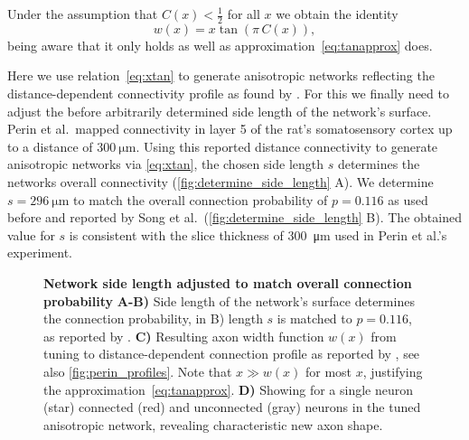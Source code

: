 Under the assumption that $C(x)<\frac{1}{2}$ for all $x$ we obtain the
identity
\begin{equation}
  w(x) = x \tan\left( \pi\, C(x) \right), \label{eq:xtan}
\end{equation} 
being aware that it only holds as well as
approximation~\ref{eq:tanapprox} does. 

Here we use relation~\ref{eq:xtan} to generate anisotropic networks
reflecting the dis\-tance-de\-pendent connectivity profile as found by
\textcite{Perin2011}. For this we finally need to adjust the before
arbitrarily determined side length of the network's surface. Perin et
al.~mapped connectivity in layer 5 of the rat's somatosensory cortex
up to a distance of $\SI{300}{\micro\meter}$. Using this reported
distance connectivity to generate anisotropic networks via
\ref{eq:xtan}, the chosen side length $s$ determines the networks
overall connectivity (\autoref{fig:determine_side_length} A). We
determine $s = \SI{296}{\micro\meter}$ to match the overall connection
probability of $p = 0.116$ as used before and reported by Song et
al.~(\autoref{fig:determine_side_length} B). The obtained value for
$s$ is consistent with the slice thickness of \SI{300}{\micro\meter}
used in Perin et al.'s experiment.


\begin{figure}[htp]
  \centering
  
  \caption{\textbf{Network side length adjusted to match overall
      connection probability} 
    \textbf{A-B)} Side length of the network's surface determines the
    connection probability, in B) length $s$ is matched to $p =
    0.116$, as reported by \textcite{Song2005}. \textbf{C)} Resulting
    axon width function $w(x)$ from tuning to distance-dependent
    connection profile as reported by \textcite{Perin2011}, see also
    \autoref{fig:perin_profiles}. Note that $x \gg w(x)$ for most $x$,
    justifying the approximation~\ref{eq:tanapprox}. \textbf{D)}
    Showing for a single neuron (star) connected (red) and unconnected
    (gray) neurons in the tuned anisotropic network, revealing
    characteristic new axon shape.}
  \label{fig:determine_side_length}
\end{figure}




